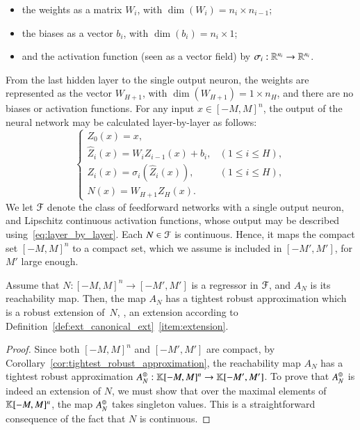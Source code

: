 \documentclass[11pt,times]{article}
\begin{document}
\begin{itemize}
\item the weights as a matrix $W_i$, with $\dim(W_i) = n_i \times
  n_{i-1}$;

  \item the biases as a vector $b_i$, with $\dim(b_i) = n_i \times
    1$;

  \item and the activation function (seen as a vector field) by
    $\sigma_i: \mathbb{R}^{n_i} \to \mathbb{R}^{n_i}$.
  
\end{itemize}
%
\noindent
From the last hidden layer to the single output neuron, the weights
are represented as the vector $W_{H+1}$, with
$\dim(W_{H+1}) = 1 \times n_H$, and there are no biases or activation
functions. For any input $x \in [-M,M]^n$, the output of the neural
network may be calculated layer-by-layer as follows:
%
\begin{equation}
  \label{eq:layer_by_layer}
  \left\{
  \begin{array}{ll}
  Z_0( x) = x,\\
  \hat{Z}_i(x) = W_i Z_{i-1}(x) + b_i, & (1 \leq i \leq H),\\
  Z_i(x) = \sigma_i \left(\hat{Z}_i(x) \right),  & (1 \leq i \leq H),\\
  N(x) = W_{H+1} Z_H (x).
  \end{array}
  \right.
\end{equation}
%
\noindent
We let ${\cal F}$ denote the class of feedforward networks with a
single output neuron, and Lipschitz continuous activation functions,
whose output may be described using~\eqref{eq:layer_by_layer}. Each
$N \in {\cal F}$ is continuous. Hence, it maps the compact set
$[-M,M]^n$ to a compact set, which we assume is included in
$[-M',M']$, for $M'$ large enough.



\begin{proposition}
  \label{prop:regressor_tightest_robust_extension}
  Assume that $N: [-M,M]^n \to [-M',M']$ is a regressor in ${\cal F}$,
  and $A_N$ is its reachability map. Then, the map $A_N$ has a
  tightest robust approximation which is a robust extension of~$N$,
  {\ie}, an extension according to
  Definition~\ref{def:ext_canonical_ext}~\ref{item:extension}.
\end{proposition}

\begin{proof}
  Since both $[-M,M]^n$ and $[-M',M']$ are compact, by
  Corollary~\ref{cor:tightest_robust_approximation}, the reachability
  map $A_N$ has a tightest robust approximation $A_N^\circledcirc: \mathbb{K}[-M,M]^n \to \mathbb{K}[-M',M']$. To prove that
  $A_N^\circledcirc$ is indeed an extension of $N$, we must show that over
  the maximal elements of $\mathbb{K}[-M,M]^n$, the map $A_N^\circledcirc$
  takes singleton values. This is a straightforward consequence of the
  fact that $N$ is continuous.
\end{proof}
\end{document}
